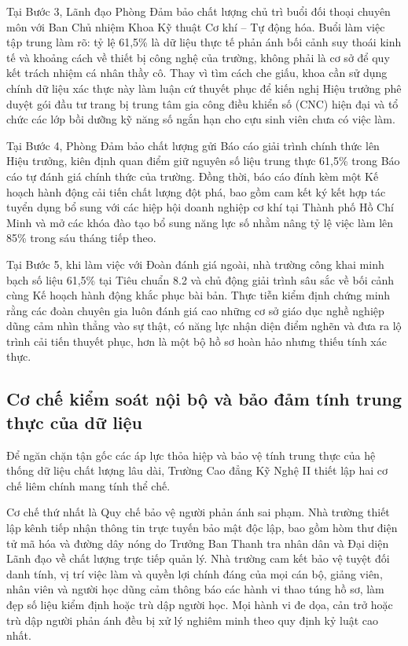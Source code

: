 Tại Bước 3, Lãnh đạo Phòng Đảm bảo chất lượng chủ trì buổi đối thoại chuyên môn với Ban Chủ nhiệm Khoa Kỹ thuật Cơ khí -- Tự động hóa. Buổi làm việc tập trung làm rõ: tỷ lệ 61,5\% là dữ liệu thực tế phản ánh bối cảnh suy thoái kinh tế và khoảng cách về thiết bị công nghệ của trường, không phải là cơ sở để quy kết trách nhiệm cá nhân thầy cô. Thay vì tìm cách che giấu, khoa cần sử dụng chính dữ liệu xác thực này làm luận cứ thuyết phục để kiến nghị Hiệu trưởng phê duyệt gói đầu tư trang bị trung tâm gia công điều khiển số (CNC) hiện đại và tổ chức các lớp bồi dưỡng kỹ năng số ngắn hạn cho cựu sinh viên chưa có việc làm.

Tại Bước 4, Phòng Đảm bảo chất lượng gửi Báo cáo giải trình chính thức lên Hiệu trưởng, kiên định quan điểm giữ nguyên số liệu trung thực 61,5\% trong Báo cáo tự đánh giá chính thức của trường. Đồng thời, báo cáo đính kèm một Kế hoạch hành động cải tiến chất lượng đột phá, bao gồm cam kết ký kết hợp tác tuyển dụng bổ sung với các hiệp hội doanh nghiệp cơ khí tại Thành phố Hồ Chí Minh và mở các khóa đào tạo bổ sung năng lực số nhằm nâng tỷ lệ việc làm lên 85\% trong sáu tháng tiếp theo.

Tại Bước 5, khi làm việc với Đoàn đánh giá ngoài, nhà trường công khai minh bạch số liệu 61,5\% tại Tiêu chuẩn 8.2 và chủ động giải trình sâu sắc về bối cảnh cùng Kế hoạch hành động khắc phục bài bản. Thực tiễn kiểm định chứng minh rằng các đoàn chuyên gia luôn đánh giá cao những cơ sở giáo dục nghề nghiệp dũng cảm nhìn thẳng vào sự thật, có năng lực nhận diện điểm nghẽn và đưa ra lộ trình cải tiến thuyết phục, hơn là một bộ hồ sơ hoàn hảo nhưng thiếu tính xác thực.

\subsection{Cơ chế kiểm soát nội bộ và bảo đảm tính trung thực của dữ liệu}

Để ngăn chặn tận gốc các áp lực thỏa hiệp và bảo vệ tính trung thực của hệ thống dữ liệu chất lượng lâu dài, Trường Cao đẳng Kỹ Nghệ II thiết lập hai cơ chế liêm chính mang tính thể chế.

Cơ chế thứ nhất là Quy chế bảo vệ người phản ánh sai phạm. Nhà trường thiết lập kênh tiếp nhận thông tin trực tuyến bảo mật độc lập, bao gồm hòm thư điện tử mã hóa và đường dây nóng do Trưởng Ban Thanh tra nhân dân và Đại diện Lãnh đạo về chất lượng trực tiếp quản lý. Nhà trường cam kết bảo vệ tuyệt đối danh tính, vị trí việc làm và quyền lợi chính đáng của mọi cán bộ, giảng viên, nhân viên và người học dũng cảm thông báo các hành vi thao túng hồ sơ, làm đẹp số liệu kiểm định hoặc trù dập người học. Mọi hành vi đe dọa, cản trở hoặc trù dập người phản ánh đều bị xử lý nghiêm minh theo quy định kỷ luật cao nhất.

